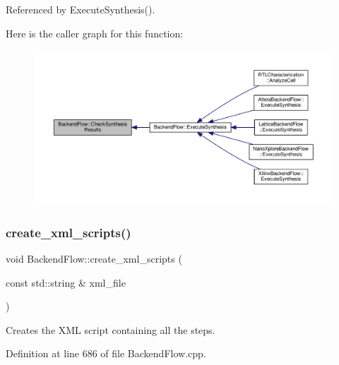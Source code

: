 Referenced by Execute\+Synthesis().

Here is the caller graph for this function\+:
\nopagebreak
\begin{figure}[H]
\begin{center}
\leavevmode
\includegraphics[width=350pt]{da/d75/classBackendFlow_ad2096d43b7c9c47611d719188215f23f_icgraph}
\end{center}
\end{figure}
\mbox{\label{classBackendFlow_a8c03d242a9fa1394a2721c9c5363e6ed}} 
\subsubsection{\texorpdfstring{create\+\_\+xml\+\_\+scripts()}{create\_xml\_scripts()}}
{\footnotesize\ttfamily void Backend\+Flow\+::create\+\_\+xml\+\_\+scripts (\begin{DoxyParamCaption}\item[{const std\+::string \&}]{xml\+\_\+file }\end{DoxyParamCaption})}



Creates the X\+ML script containing all the steps. 



Definition at line 686 of file Backend\+Flow.\+cpp.



